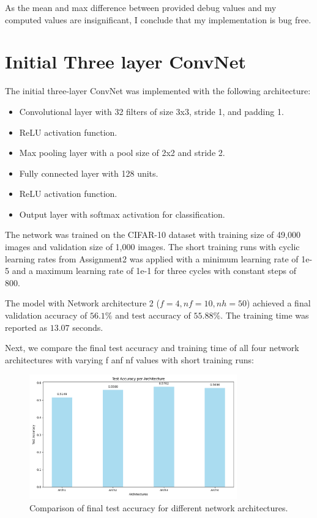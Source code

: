 \documentclass[11pt]{article}
\begin{document}
As the mean and max difference between provided debug values and my computed values are insignificant, I conclude that my implementation is bug free.

\section*{Initial Three layer ConvNet}

The initial three-layer ConvNet was implemented with the following architecture:
\begin{itemize}
  \item Convolutional layer with 32 filters of size 3x3, stride 1, and padding 1.
  \item ReLU activation function.
  \item Max pooling layer with a pool size of 2x2 and stride 2.
  \item Fully connected layer with 128 units.
  \item ReLU activation function.
  \item Output layer with softmax activation for classification.
\end{itemize}

The network was trained on the CIFAR-10 dataset with training size of 49,000 images and validation size of 1,000 images. The short training runs with cyclic learning rates from Assignment2 was applied with a minimum learning rate of 1e-5 and a maximum learning rate of 1e-1 for three cycles with constant steps of 800. 

The model with Network architecture 2 ($f=4, nf=10, nh=50$) achieved a final validation accuracy of $56.1\%$ and test accuracy of $55.88\%$. The training time was reported as $13.07$ seconds.

Next, we compare the final test accuracy and training time of all four network architectures with varying f anf nf values with short training runs:

\begin{figure}[H]
    \centering
    \includegraphics[width=0.8\textwidth]{results/architecture_test_accuracy.png}
    \caption{Comparison of final test accuracy for different network architectures.}
    \label{fig:network_architecture_acc_comparison}
\end{figure}
\end{document}
